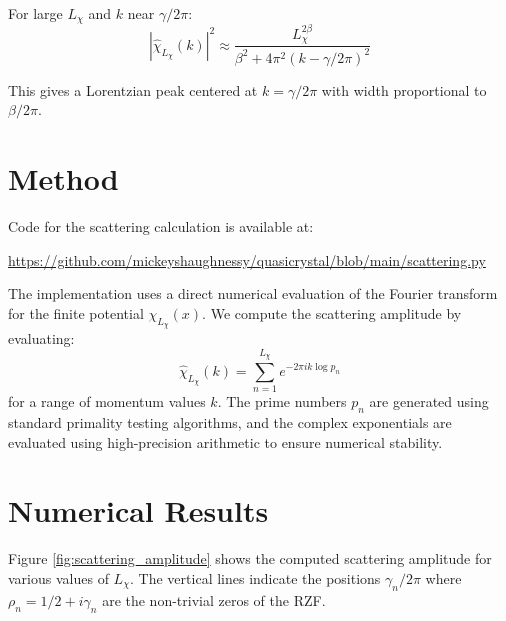 \documentclass[11pt, oneside]{article}
\begin{document}
For large $L_\chi$ and $k$ near $\gamma/2\pi$:
\begin{equation}
|\hat{\chi}_{L_\chi}(k)|^2 \approx \frac{L_\chi^{2\beta}}{\beta^2 + 4\pi^2(k - \gamma/2\pi)^2}
\end{equation}

This gives a Lorentzian peak centered at $k = \gamma/2\pi$ with width proportional to $\beta/2\pi$.

\section{Method}

Code for the scattering calculation is available at:
 
\url{https://github.com/mickeyshaughnessy/quasicrystal/blob/main/scattering.py}

% 

The implementation uses a direct numerical evaluation of the Fourier transform for the finite potential $\chi_{L_\chi}(x)$. We compute the scattering amplitude by evaluating:
\begin{equation}
\hat{\chi}_{L_\chi}(k) = \sum_{n=1}^{L_\chi} e^{-2\pi i k \log p_n}
\end{equation}
for a range of momentum values $k$. The prime numbers $p_n$ are generated using standard primality testing algorithms, and the complex exponentials are evaluated using high-precision arithmetic to ensure numerical stability.

\section{Numerical Results}

Figure \ref{fig:scattering_amplitude} shows the computed scattering amplitude for various values of $L_\chi$. The vertical lines indicate the positions $\gamma_n/2\pi$ where $\rho_n = 1/2 + i\gamma_n$ are the non-trivial zeros of the RZF.
\end{document}
